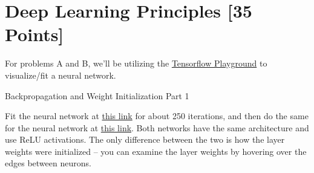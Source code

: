 \newif\ifshowsolutions
\showsolutionstrue







\pagestyle{fancy}




\newpage
\section{Deep Learning Principles [35 Points]}

For problems A and B, we'll be utilizing the \href{http://playground.tensorflow.org/}{Tensorflow Playground} to visualize/fit a neural network.

\begin{problem}[5]
  Backpropagation and Weight Initialization Part 1
\end{problem}

Fit the neural network at \href{http://playground.tensorflow.org/#activation=relu&batchSize=10&dataset=circle&regDataset=reg-plane&learningRate=0.03&regularizationRate=0&noise=0&networkShape=4,2&seed=0.65409&showTestData=false&discretize=false&percTrainData=50&x=true&y=true&xTimesY=false&xSquared=false&ySquared=false&cosX=false&sinX=false&cosY=false&sinY=false&collectStats=false&problem=classification&initZero=false&hideText=false}{this link} for about 250 iterations, and then do the same for the neural network at  \href{http://playground.tensorflow.org//\#activation=relu&batchSize=10&dataset=circle&regDataset=reg-plane&learningRate=0.03&regularizationRate=0&noise=0&networkShape=4,2&seed=0.6&showTestData=false&discretize=false&percTrainData=50&x=true&y=true&xTimesY=false&xSquared=false&ySquared=false&cosX=false&sinX=false&cosY=false&sinY=false&collectStats=false&problem=classification&initZero=true&hideText=false}{this link}.  Both networks have the same architecture and use ReLU activations.  The only difference between the two is how the layer weights were initialized -- you can examine the layer weights by hovering over the edges between neurons.

